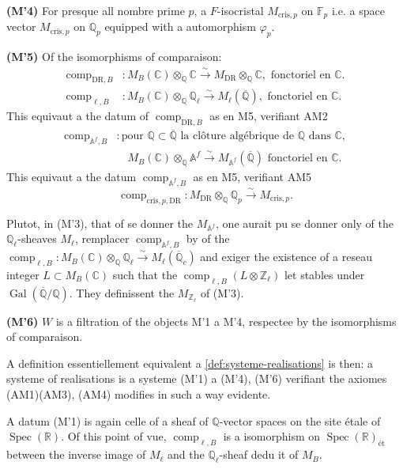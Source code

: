 \documentclass[12pt,a4paper]{article}
\theoremstyle{plain}
\theoremstyle{definition}
\theoremstyle{remark}
\DeclareMathOperator{\Spec}{Spec}
\DeclareMathOperator{\Gal}{Gal}
\providecommand{\Gal}{\operatorname{Gal}}
\providecommand{\Spec}{\operatorname{Spec}}
\providecommand{\DR}{\mathrm{DR}}
\providecommand{\cris}{\mathrm{cris}}
\providecommand{\comp}{\operatorname{comp}}
\begin{document}
\textbf{(M'4)} For presque all nombre prime $p$, a $F$-isocristal $M_{\cris,p}$ on
$\mathbb{F}_p$ i.e. a space vector $M_{\cris,p}$ on $\mathbb{Q}_p$ equipped with a
automorphism $\varphi_p$.

\textbf{(M'5)} Of the isomorphisms of comparaison:
\begin{align*}
\comp_{\DR,B} &: M_B(\mathbb{C}) \otimes_{\mathbb{Q}} \mathbb{C} \xrightarrow{\sim}
M_{\DR} \otimes_{\mathbb{Q}} \mathbb{C}, \text{ fonctoriel en } \mathbb{C}.\\
\comp_{\ell,B} &: M_B(\mathbb{C}) \otimes_{\mathbb{Q}} \mathbb{Q}_\ell \xrightarrow{\sim}
M_\ell(\overline{\mathbb{Q}}), \text{ fonctoriel en } \mathbb{C}.
\end{align*}
This equivaut a the datum of $\comp_{\DR,B}$ as en M5, verifiant AM2
\begin{align*}
\comp_{\mathbb{A}^f,B} &: \text{pour } \mathbb{Q} \subset \overline{\mathbb{Q}}
\text{ la cl\^oture alg\'ebrique de } \mathbb{Q} \text{ dans } \mathbb{C},\\
&\quad M_B(\mathbb{C}) \otimes_{\mathbb{Q}} \mathbb{A}^f \xrightarrow{\sim}
M_{\mathbb{A}^f}(\overline{\mathbb{Q}}) \text{ fonctoriel en } \mathbb{C}.
\end{align*}
This equivaut a the datum $\comp_{\mathbb{A}^f,B}$ as en M5, verifiant AM5
\[
\comp_{\cris,p,\DR}: M_{\DR} \otimes_{\mathbb{Q}} \mathbb{Q}_p \xrightarrow{\sim}
M_{\cris,p}.
\]

Plutot, in (M'3), that of se donner the $M_{\mathbb{A}^f}$, one aurait pu se donner
only of the $\mathbb{Q}_\ell$-sheaves $M_\ell$, remplacer
$\comp_{\mathbb{A}^f,B}$ by of the $\comp_{\ell,B}: M_B(\mathbb{C}) \otimes_{\mathbb{Q}}
\mathbb{Q}_\ell \xrightarrow{\sim} M_\ell(\overline{\mathbb{Q}}_c)$ and exiger the existence of a
reseau integer $L \subset M_B(\mathbb{C})$ such that the $\comp_{\ell,B}(L \otimes
\mathbb{Z}_\ell)$ let stables under $\Gal(\overline{\mathbb{Q}}/\mathbb{Q})$. They definissent
the $M_{\mathbb{Z}_\ell}$ of (M'3).

\textbf{(M'6)} $W$ is a filtration of the objects M'1 a M'4, respectee by the
isomorphisms of comparaison.

A definition essentiellement equivalent a \ref{def:systeme-realisations} is then:
a systeme of realisations is a systeme (M'1) a (M'4), (M'6) verifiant the
axiomes (AM1)(AM3), (AM4) modifies in such a way evidente.

A datum (M'1) is again celle of a sheaf of $\mathbb{Q}$-vector spaces on the
site étale of $\Spec(\mathbb{R})$. Of this point of vue, $\comp_{\ell,B}$ is a
isomorphism on $\Spec(\mathbb{R})_\text{\'et}$ between the inverse image of $M_\ell$ and the
$\mathbb{Q}_\ell$-sheaf dedu it of $M_B$.
\end{document}
